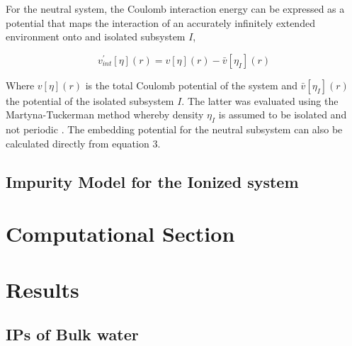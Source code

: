 \documentclass[12pt,a4paper]{article}
\begin{document}
For the neutral system, the Coulomb interaction energy can be expressed as a potential that maps the interaction of an accurately infinitely extended
environment onto and isolated subsystem $I$,

\begin{equation}
	v^{'}_{int} [\eta] (r) = v[\eta](r) - \bar{v} [\eta_I](r)
\end{equation}

Where $v[\eta](r)$ is the total Coulomb potential of the system and $\bar{v} [\eta_I](r)$ the potential of the isolated subsystem $I$. The latter was evaluated using the Martyna-Tuckerman method whereby density $\eta_I$ is assumed to be isolated and not periodic \cite{martyna1999reciprocal}. The embedding potential for the neutral subsystem can also be calculated directly from equation $3$.

\subsection{Impurity Model for the Ionized system}

\section{Computational Section}

\section{Results}
\subsection{IPs of Bulk water}
\end{document}
